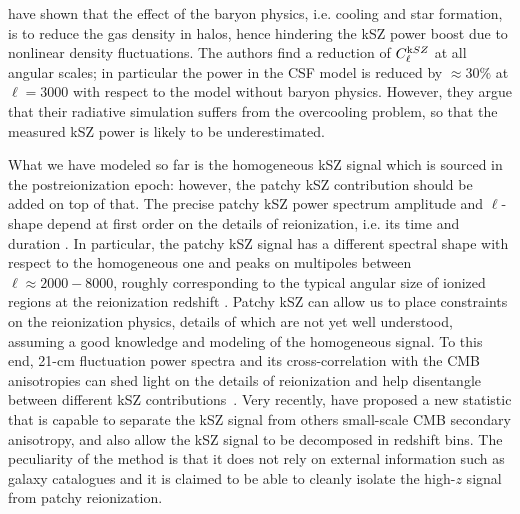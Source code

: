\cite{Shaw2012} have shown that the effect of the baryon physics, i.e. cooling and star formation, is to reduce the gas density in halos, hence hindering the kSZ power boost due to nonlinear density fluctuations. The authors find a reduction of $C_{\ell}^{\rm kSZ}$ at all angular scales; in particular the power in the CSF model is reduced by $\approx 30\%$ at $\ell=3000$ with respect to the model without baryon physics. However, they argue that their radiative simulation suffers from the overcooling problem, so that the measured kSZ power is likely to be underestimated.

What we have modeled so far is the homogeneous kSZ signal which is sourced in the postreionization epoch: however, the patchy kSZ contribution should be added on top of that. The precise patchy kSZ power spectrum amplitude and $\ell$-shape depend at first order on the details of reionization, i.e. its time and duration \citep{Zahn2005,McQuinn2005,Iliev2006}. In particular, the patchy kSZ signal has a different spectral shape with respect to the homogeneous one and peaks on multipoles between $\ell \approx 2000 - 8000$, roughly corresponding to the typical angular size of ionized regions at the reionization redshift \citep{Iliev2006}. Patchy kSZ can allow us to place constraints on the reionization physics, details of which are not yet well understood, assuming a good knowledge and modeling of the homogeneous signal. To this end, 21-cm fluctuation power spectra and its cross-correlation with the CMB anisotropies can shed light on the details of reionization and help disentangle between different kSZ contributions~\citep{Jelic2014}. Very recently, \cite{Smith2016} have proposed a new statistic that is capable to separate the kSZ signal from others small-scale \gls{CMB} secondary anisotropy, and also allow the kSZ signal to be decomposed in redshift bins. The peculiarity of the method is that it does not rely on external information such as galaxy catalogues and it is claimed to be able to cleanly isolate the high-$z$ signal from patchy reionization.

